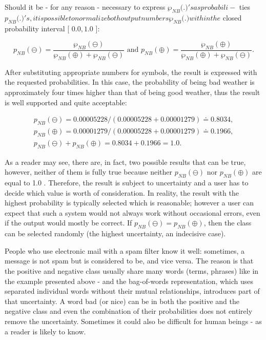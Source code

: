 \documentclass[11pt,openany,executivepaper]{book}
\begin{document}
Should it be - for any reason - necessary to express $\wp_{N B}($.$) 's as probabili-$ ties $p_{N B}($.$) 's, it is possible to normalize both output numbers \wp_{N B}($.$) within the$ closed probability interval [ $0.0,1.0$ ]:

$$
p_{N B}(\ominus)=\frac{\wp_{N B}(\ominus)}{\wp_{N B}(\oplus)+\wp_{N B}(\ominus)} \text { and } p_{N B}(\oplus)=\frac{\wp_{N B}(\oplus)}{\wp_{N B}(\oplus)+\wp_{N B}(\ominus)} .
$$

After substituting appropriate numbers for symbols, the result is expressed with the requested probabilities. In this case, the probability of being bad weather is approximately four times higher than that of being good weather, thus the result is well supported and quite acceptable:

$$
\begin{gathered}
p_{N B}(\ominus)=0.00005228 /(0.00005228+0.00001279) \doteq 0.8034, \\
p_{N B}(\oplus)=0.00001279 /(0.00005228+0.00001279) \doteq 0.1966, \\
p_{N B}(\ominus)+p_{N B}(\oplus)=0.8034+0.1966=1.0 .
\end{gathered}
$$

As a reader may see, there are, in fact, two possible results that can be true, however, neither of them is fully true because neither $p_{N B}(\ominus)$ nor $p_{N B}(\oplus)$ are equal to 1.0 . Therefore, the result is subject to uncertainty and a user has to decide which value is worth of consideration. In reality, the result with the highest probability is typically selected which is reasonable; however a user can expect that such a system would not always work without occasional errors, even if the output would mostly be correct. If $p_{N B}(\ominus)=p_{N B}(\oplus)$, then the class can be selected randomly (the highest uncertainty, an indecisive case).

People who use electronic mail with a spam filter know it well: sometimes, a message is not spam but is considered to be, and vice versa. The reason is that the positive and negative class usually share many words (terms, phrases) like in the example presented above - and the bag-of-words representation, which uses separated individual words without their mutual relationships, introduces part of that uncertainty. A word bad (or nice) can be in both the positive and the negative class and even the combination of their probabilities does not entirely remove the uncertainty. Sometimes it could also be difficult for human beings - as a reader is likely to know.
\end{document}
